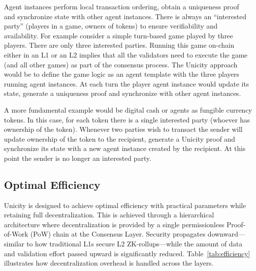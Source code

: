 \documentclass{article}
\begin{document}
Agent instances perform local transaction ordering, obtain a uniqueness proof and synchronize state with other agent instances. There is always an ``interested party'' (players in a game, owners of tokens) to ensure verifiability and availability. For example consider a simple turn-based game played by three players. There are only three interested parties. Running this game on-chain either in an L1 or an L2 implies that all the validators  need to execute the game (and all other games) as part of the consensus process. The Unicity approach would be to define the game logic as an agent template with the three players running agent instances. At each turn the player agent instance would update its state, generate a uniqueness proof and synchronize with other agent instances.

A more fundamental example would be digital cash or agents as fungible currency tokens. In this case, for each token there is a single interested party (whoever has ownership of the token). Whenever two parties wish to transact the sender will update ownership of the token to the recipient, generate a Unicity proof and synchronize its state with a new agent instance created by the recipient. At this point the sender is no longer an interested party.

\subsection{Optimal Efficiency}

Unicity is designed to achieve optimal efficiency with practical parameters while retaining full decentralization. This is achieved through a hierarchical architecture where decentralization is provided by a single permissionless Proof-of-Work (PoW) chain at the Consensus Layer. Security propagates downward—similar to how traditional L1s secure L2 ZK-rollups—while the amount of data and validation effort passed upward is significantly reduced. Table~\ref{tab:efficiency} illustrates how decentralization overhead is handled across the layers.
\end{document}
